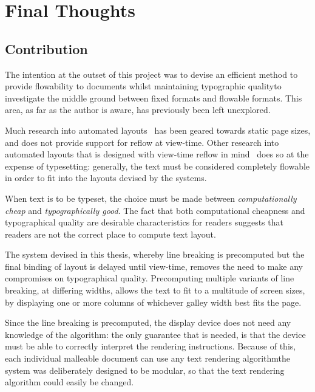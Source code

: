 \chapter{Final Thoughts}\label{ch:conclusions}

\section{Contribution}
The intention at the outset of this project was to devise an efficient method to provide flowability to documents whilst maintaining typographic quality\ed to investigate the middle ground between fixed formats and flowable formats. This area, as far as the author is aware, has previously been left unexplored.

Much research into automated layouts~\cite{Johari1996,Goldenberg2002,Purvis2003,Balinsky2009} has been geared towards static page sizes, and does not provide support for reflow at view-time. Other research into automated layouts that is designed with view-time reflow in mind~\cite{Jacobs2003,Schrier2008} does so at the expense of typesetting: generally, the text must be considered completely flowable in order to fit into the layouts devised by the systems.

When text is to be typeset, the choice must be made between \emph{computationally cheap} and \emph{typographically good}. The fact that both computational cheapness and typographical quality are desirable characteristics for \ebook{} readers suggests that \ebook{} readers are not the correct place to compute text layout.

The system devised in this thesis, whereby line breaking is precomputed but the final binding of layout is delayed until view-time, removes the need to make any compromises on typographical quality. Precomputing multiple variants of line breaking, at differing widths, allows the text to fit to a multitude of screen sizes, by displaying one or more columns of whichever galley width best fits the page.

Since the line breaking is precomputed, the display device does not need any knowledge of the algorithm: the only guarantee that is needed, is that the device must be able to correctly interpret the rendering instructions. Because of this, each individual malleable document can use any text rendering algorithm\ed the system was deliberately designed to be modular, so that the text rendering algorithm could easily be changed.



